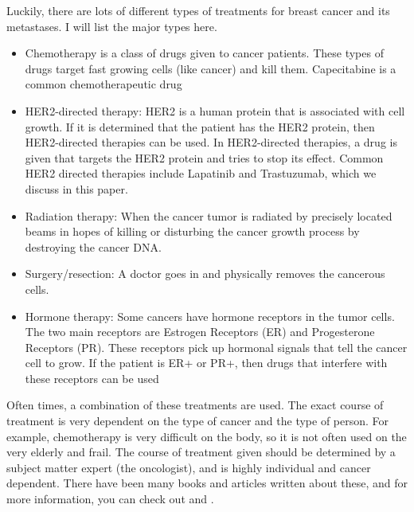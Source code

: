 Luckily, there are lots of different types of treatments for breast cancer and its metastases. I will list the major types here. 
\begin{comment}
(http://www.cancer.gov/types/breast/patient/breast-treatment-pdq)
\end{comment}
\begin{itemize}
\item Chemotherapy is a class of drugs given to cancer patients. These types of drugs target fast growing cells (like cancer) and kill them. Capecitabine is a common chemotherapeutic drug
\item HER2-directed therapy: HER2 is a human protein that is associated with cell growth. If it is determined that the patient has the HER2 protein, then HER2-directed therapies can be used. In HER2-directed therapies, a drug is given that targets the HER2 protein and tries to stop its effect. Common HER2 directed therapies include Lapatinib and Trastuzumab, which we discuss in this paper.
\item Radiation therapy: When the cancer tumor is radiated by precisely located beams in hopes of killing or disturbing the cancer growth process by destroying the cancer DNA.
\item Surgery/resection: A doctor goes in and physically removes the cancerous cells.
\item Hormone therapy: Some cancers have hormone receptors in the tumor cells. The two main receptors are Estrogen Receptors (ER) and Progesterone Receptors (PR). These receptors pick up hormonal signals that tell the cancer cell to grow. If the patient is ER+ or PR+, then drugs that interfere with these receptors can be used
\end{itemize}
Often times, a combination of these treatments are used. The exact course of treatment is very dependent on the type of cancer and the type of person. For example, chemotherapy is very difficult on the body, so it is not often used on the very elderly and frail. The course of treatment given should be determined by a subject matter expert (the oncologist), and is highly individual and cancer dependent.
There have been many books and articles written about these, and for more information, you can check out \cite{Cooper1992} and \cite{Morris1998}.
